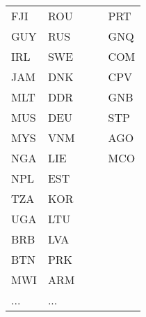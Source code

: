 \begin{table}[ht!]
\begin{tabular}{lllll}
      FJI &       ROU &           &           &       PRT \\
      GUY &       RUS &           &           &       GNQ \\
      IRL &       SWE &           &           &       COM \\
      JAM &       DNK &           &           &       CPV \\
      MLT &       DDR &           &           &       GNB \\
      MUS &       DEU &           &           &       STP \\
      MYS &       VNM &           &           &       AGO \\
      NGA &       LIE &           &           &       MCO \\
      NPL &       EST &           &           &           \\
      TZA &       KOR &           &           &           \\
      UGA &       LTU &           &           &           \\
      BRB &       LVA &           &           &           \\
      BTN &       PRK &           &           &           \\
      MWI &       ARM &           &           &           \\
      ... &        ...& &&\\

\end{tabular}
\end{table}
